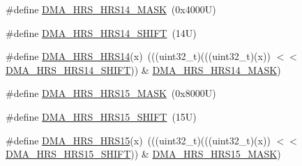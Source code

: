 \begin{DoxyCompactItemize}
\item 
\#define \mbox{\hyperlink{group___d_m_a___register___masks_ga70ee6df2c5cce431c6b9d3e3f958bd69}{D\+M\+A\+\_\+\+H\+R\+S\+\_\+\+H\+R\+S14\+\_\+\+M\+A\+SK}}~(0x4000\+U)
\item 
\#define \mbox{\hyperlink{group___d_m_a___register___masks_ga183e6503c7ed5e4b07f9df2bf47d46a9}{D\+M\+A\+\_\+\+H\+R\+S\+\_\+\+H\+R\+S14\+\_\+\+S\+H\+I\+FT}}~(14\+U)
\item 
\#define \mbox{\hyperlink{group___d_m_a___register___masks_gaa0765f0b86365326900b7623e166519a}{D\+M\+A\+\_\+\+H\+R\+S\+\_\+\+H\+R\+S14}}(x)~(((uint32\+\_\+t)(((uint32\+\_\+t)(x)) $<$$<$ \mbox{\hyperlink{group___d_m_a___register___masks_ga183e6503c7ed5e4b07f9df2bf47d46a9}{D\+M\+A\+\_\+\+H\+R\+S\+\_\+\+H\+R\+S14\+\_\+\+S\+H\+I\+FT}})) \& \mbox{\hyperlink{group___d_m_a___register___masks_ga70ee6df2c5cce431c6b9d3e3f958bd69}{D\+M\+A\+\_\+\+H\+R\+S\+\_\+\+H\+R\+S14\+\_\+\+M\+A\+SK}})
\item 
\#define \mbox{\hyperlink{group___d_m_a___register___masks_ga95ddced80fcb33b665fa1b6aad38210b}{D\+M\+A\+\_\+\+H\+R\+S\+\_\+\+H\+R\+S15\+\_\+\+M\+A\+SK}}~(0x8000\+U)
\item 
\#define \mbox{\hyperlink{group___d_m_a___register___masks_gac91c063a84c76a6cf385cd3bda8f244a}{D\+M\+A\+\_\+\+H\+R\+S\+\_\+\+H\+R\+S15\+\_\+\+S\+H\+I\+FT}}~(15\+U)
\item 
\#define \mbox{\hyperlink{group___d_m_a___register___masks_ga2a58ea4983750062cd57f36cf91e3083}{D\+M\+A\+\_\+\+H\+R\+S\+\_\+\+H\+R\+S15}}(x)~(((uint32\+\_\+t)(((uint32\+\_\+t)(x)) $<$$<$ \mbox{\hyperlink{group___d_m_a___register___masks_gac91c063a84c76a6cf385cd3bda8f244a}{D\+M\+A\+\_\+\+H\+R\+S\+\_\+\+H\+R\+S15\+\_\+\+S\+H\+I\+FT}})) \& \mbox{\hyperlink{group___d_m_a___register___masks_ga95ddced80fcb33b665fa1b6aad38210b}{D\+M\+A\+\_\+\+H\+R\+S\+\_\+\+H\+R\+S15\+\_\+\+M\+A\+SK}})
\end{DoxyCompactItemize}
